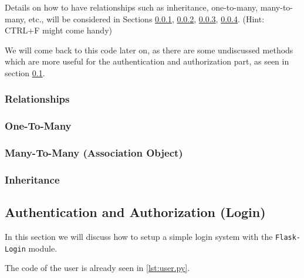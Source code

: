 \documentclass[../main/main.tex]{subfiles}
\begin{document}
Details on how to have relationships such as inheritance, one-to-many,
many-to-many, etc., will be considered in Sections
\ref{sec:relationships}, \ref{sec:onetomany}, \ref{sec:manytomany},
\ref{sec:inheritance}. (Hint: CTRL+F might come handy) 

We will come back to this code later on, as there are some undiscussed
methods which are more useful for the authentication and authorization
part, as seen in section \ref{sec:auth}.

\subsubsection{Relationships}
\label{sec:relationships}

\subsubsection{One-To-Many}
\label{sec:onetomany}

\subsubsection{Many-To-Many (Association Object)}
\label{sec:manytomany}

\subsubsection{Inheritance}
\label{sec:inheritance}

\subsection{Authentication and Authorization (Login)}
\label{sec:auth}

In this section we will discuss how to setup a simple login system
with the \lstinline|Flask-Login| module. 

The code of the user is already seen in \ref{lst:user.py}. 



% 
\end{document}
